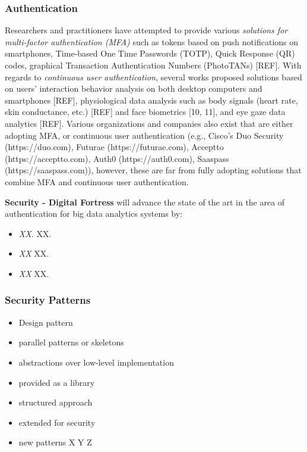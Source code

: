 \documentclass[a4paper,11pt]{article}
\newcommand{\project}[1]{\textbf{#1}\xspace}
\newcommand{\SECURITY}{\project{Security - Digital Fortress}}
\newcommand{\TheProject}{\SECURITY}
\begin{document}
\subsubsection{Authentication}
\label{sect:auth}

Researchers and practitioners have attempted to provide various \textit{solutions for multi-factor authentication (MFA)} such as tokens based on push notifications on smartphones, Time-based One Time Passwords (TOTP), Quick Response (QR) codes, graphical Transaction Authentication Numbers (PhotoTANs) [REF]. With regards to \textit{continuous user authentication}, several works proposed solutions based on users’ interaction behavior analysis on both desktop computers and smartphones [REF], physiological data analysis such as body signals (heart rate, skin conductance, etc.) [REF] and face biometrics [10, 11], and eye gaze data analytics [REF]. Various organizations and companies also exist that are either adopting MFA, or continuous user authentication (e.g., Cisco’s Duo Security (https://duo.com), Futurae (https://futurae.com), Acceptto (https://acceptto.com), Auth0 (https://auth0.com), Saaspass (https://saaspass.com)), however, these are far from fully adopting solutions that combine MFA and continuous user authentication. 

\begin{mdframed}[backgroundcolor=gray!10]
\TheProject{} will advance the state of the art in the area of authentication for big data analytics systems by:
\begin{itemize}
\item \emph{XX.} XX.
\item \emph{XX} XX.
\item \emph{XX} XX.
\end{itemize}
\end{mdframed}

\subsubsection{Security Patterns}


\begin{itemize}
	\item Design pattern
	\item parallel patterns or skeletons
	\item abstractions over low-level implementation
	\item provided as a library
	\item structured approach
	\item extended for security
	\item new patterns X Y Z
\end{itemize}
\end{document}
